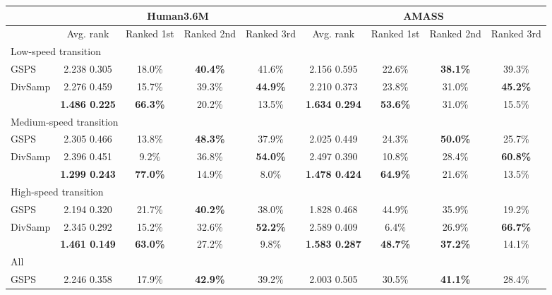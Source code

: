 \documentclass[10pt,twocolumn,letterpaper]{article}
\begin{document}
\setlength{\tabcolsep}{4pt}
\begin{table*}[t!]\renewcommand{\arraystretch}{0.9}
    \footnotesize
    \centering
    \begin{tabular}{l@{\hskip 8mm}cccc@{\hskip 8mm}cccc}
        \toprule
        & \multicolumn{4}{c}{Human3.6M\cite{ionescu2013h36m}} & \multicolumn{4}{c}{AMASS\cite{mahmood2019amass}} \\
        \midrule
        & Avg. rank & Ranked 1st & Ranked 2nd & Ranked 3rd & Avg. rank & Ranked 1st & Ranked 2nd & Ranked 3rd \\
        \midrule
        \multicolumn{9}{l}{Low-speed transition} \\
        \midrule
        GSPS & 2.238  0.305 & 18.0\% & \textbf{40.4\%} & 41.6\% & 2.156  0.595 & 22.6\% & \textbf{38.1\%} & 39.3\%\\
        DivSamp & 2.276  0.459 & 15.7\% & 39.3\% & \textbf{44.9\%} & 2.210  0.373 & 23.8\% & 31.0\% & \textbf{45.2\%}\\
        \modelname{} & \textbf{1.486  0.225} & \textbf{66.3\%} & 20.2\% & 13.5\% & \textbf{1.634  0.294} & \textbf{53.6\%} & 31.0\% & 15.5\%\\
        \midrule
        \multicolumn{9}{l}{Medium-speed transition} \\
        \midrule
        GSPS & 2.305  0.466 & 13.8\% & \textbf{48.3\%} & 37.9\% & 2.025  0.449 & 24.3\% & \textbf{50.0\%} & 25.7\%\\
        DivSamp & 2.396  0.451 & 9.2\% & 36.8\% & \textbf{54.0\%} & 2.497  0.390 & 10.8\% & 28.4\% & \textbf{60.8\%}\\
        \modelname{} & \textbf{1.299  0.243} & \textbf{77.0\%} & 14.9\% & 8.0\% & \textbf{1.478  0.424} & \textbf{64.9\%} & 21.6\% & 13.5\%\\
        \midrule
        \multicolumn{9}{l}{High-speed transition} \\
        \midrule
        GSPS & 2.194  0.320 & 21.7\% & \textbf{40.2\%} & 38.0\% & 1.828  0.468 & 44.9\% & 35.9\% & 19.2\%\\
        DivSamp & 2.345  0.292 & 15.2\% & 32.6\% & \textbf{52.2\%} & 2.589  0.409 & 6.4\% & 26.9\% & \textbf{66.7\%}\\
        \modelname{} & \textbf{1.461  0.149} & \textbf{63.0\%} & 27.2\% & 9.8\% & \textbf{1.583  0.287} & \textbf{48.7\%} & \textbf{37.2\%} & 14.1\%\\
        \midrule
        \multicolumn{9}{l}{All} \\
        \midrule
        GSPS & 2.246  0.358 & 17.9\% & \textbf{42.9\%} & 39.2\% & 2.003  0.505 & 30.5\% & \textbf{41.1\%} & 28.4\% \\

\end{tabular}
\end{table*}
\end{document}
